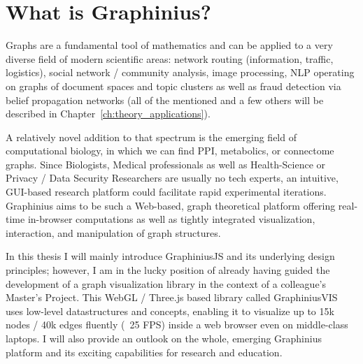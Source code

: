 \section{What is Graphinius?}
\label{sect:intro_whats_graphinius}

Graphs are a fundamental tool of mathematics and can be applied to a very diverse field of modern scientific areas: network routing (information, traffic, logistics), social network / community analysis, image processing, NLP operating on graphs of document spaces and topic clusters as well as fraud detection via belief propagation networks (all of the mentioned and a few others will be described in Chapter~\ref{ch:theory_applications}).

A relatively novel addition to that spectrum is the emerging field of computational biology, in which we can find PPI, metabolics, or connectome graphs. Since Biologists, Medical professionals as well as Health-Science or Privacy / Data Security Researchers are usually no tech experts, an intuitive, GUI-based research platform could facilitate rapid experimental iterations. Graphinius aims to be such a Web-based, graph theoretical platform offering real-time in-browser computations as well as tightly integrated visualization, interaction, and manipulation of graph structures. 

In this thesis I will mainly introduce GraphiniusJS and its underlying design principles; however, I am in the lucky position of already having guided the development of a graph visualization library in the context of a colleague's Master's Project. This WebGL / Three.js based library called GraphiniusVIS uses low-level datastructures and concepts, enabling it to visualize up to 15k nodes / 40k edges fluently (~25 FPS) inside a web browser even on middle-class laptops. I will also provide an outlook on the whole, emerging Graphinius platform and its exciting capabilities for research and education.


